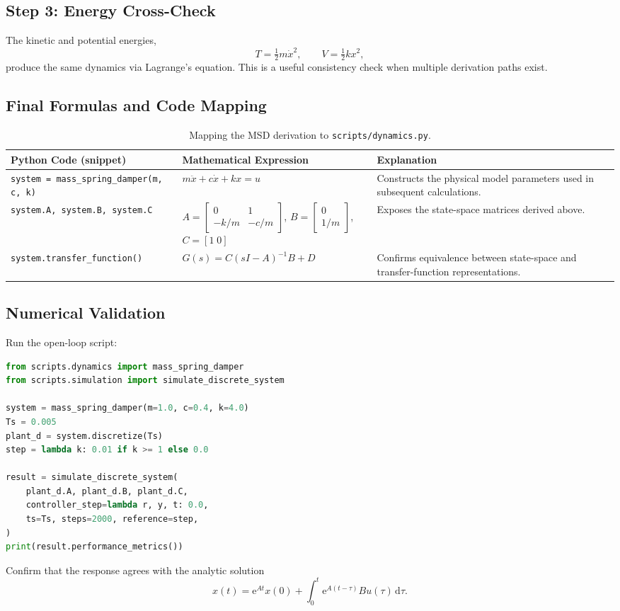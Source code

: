 \subsection{Step 3: Energy Cross-Check}
The kinetic and potential energies,
\[
    T = \tfrac{1}{2} m \dot{x}^2,\qquad V = \tfrac{1}{2} k x^2,
\]
produce the same dynamics via Lagrange's equation. This is a useful consistency check when multiple derivation paths exist.

\subsection{Final Formulas and Code Mapping}
\begin{table}[h]
    \centering
    \small
    \renewcommand{\arraystretch}{1.2}
    \begin{tabularx}{\linewidth}{|>{\raggedright\arraybackslash}p{4cm}|X|X|}
        \hline
        \textbf{Python Code (snippet)} & \textbf{Mathematical Expression} & \textbf{Explanation} \\
        \hline
        \texttt{system = mass\_spring\_damper(m, c, k)} & $m \ddot{x} + c \dot{x} + k x = u$ & Constructs the physical model parameters used in subsequent calculations. \\
        \hline
        \texttt{system.A, system.B, system.C} & $A = \begin{bmatrix}0 & 1 \\ -k/m & -c/m\end{bmatrix}$, $B = \begin{bmatrix}0 \\ 1/m\end{bmatrix}$, $C = [1\;0]$ & Exposes the state-space matrices derived above. \\
        \hline
        \texttt{system.transfer\_function()} & $G(s) = C (s I - A)^{-1} B + D$ & Confirms equivalence between state-space and transfer-function representations. \\
        \hline
    \end{tabularx}
    \caption{Mapping the MSD derivation to \texttt{scripts/dynamics.py}.}
\end{table}

\subsection{Numerical Validation}
Run the open-loop script:
\begin{lstlisting}[language=python]
from scripts.dynamics import mass_spring_damper
from scripts.simulation import simulate_discrete_system

system = mass_spring_damper(m=1.0, c=0.4, k=4.0)
Ts = 0.005
plant_d = system.discretize(Ts)
step = lambda k: 0.01 if k >= 1 else 0.0

result = simulate_discrete_system(
    plant_d.A, plant_d.B, plant_d.C,
    controller_step=lambda r, y, t: 0.0,
    ts=Ts, steps=2000, reference=step,
)
print(result.performance_metrics())
\end{lstlisting}
Confirm that the response agrees with the analytic solution
\[
    x(t) = \mathrm{e}^{A t} x(0) + \int_{0}^{t} \mathrm{e}^{A (t - \tau)} B u(\tau)\,\mathrm{d}\tau.
\]

